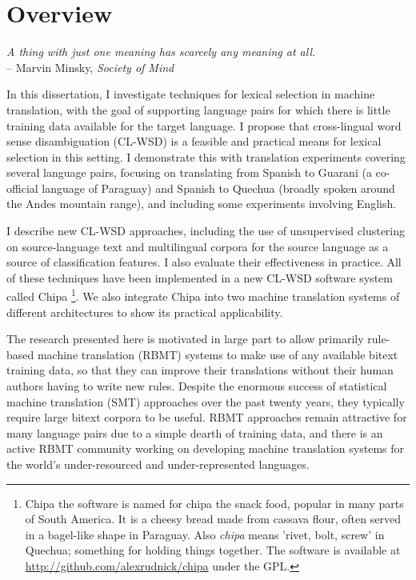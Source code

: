 \chapter{Overview}
\label{chap:overview}

\begin{centering}
\emph{A thing with just one meaning has scarcely any meaning at
all.} \\
-- Marvin Minsky, \emph{Society of Mind} \cite{minsky1988society} \\
\end{centering}
\bigskip

In this dissertation, I investigate techniques for lexical selection in
machine translation, with the goal of supporting language pairs for which 
there is little training data available for the target language. I propose
that cross-lingual word sense disambiguation (CL-WSD) is a feasible and
practical means for lexical selection in this setting. I demonstrate
this with translation experiments covering several language pairs, focusing on
translating from Spanish to Guarani (a co-official language of Paraguay) and
Spanish to Quechua (broadly spoken around the Andes mountain range), and
including some experiments involving English.

I describe new CL-WSD approaches, including the use of unsupervised clustering
on source-language text and multilingual corpora for the source language as a
source of classification features. I also evaluate their effectiveness in
practice. All of these techniques have been implemented in a new CL-WSD
software system called Chipa
\footnote{Chipa the software is named for chipa the snack food, popular in many
  parts of South America. It is a cheesy bread made from cassava flour, often
  served in a bagel-like shape in Paraguay.  Also \emph{chipa} means 'rivet,
  bolt, screw' in Quechua; something for holding things together.  The software
is available at \\ \url{http://github.com/alexrudnick/chipa} under the GPL.}.
We also integrate Chipa into two machine translation systems of different
architectures to show its practical applicability.

The research presented here is motivated in large part to allow primarily
rule-based machine translation (RBMT) systems to make use of any available
bitext training data, so that they can improve their translations without their
human authors having to write new rules.  Despite the enormous
success of statistical machine translation (SMT) approaches over the past
twenty years, they typically require large bitext corpora to be useful. RBMT
approaches remain attractive for many language pairs due to a simple dearth of
training data, and there is an active RBMT community working on developing
machine translation systems for the world's under-resourced and
under-represented languages.

